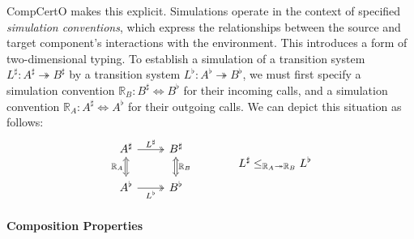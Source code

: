 \documentclass[acmsmall,screen,review,anonymous]{acmart}
\begin{document}
CompCertO makes this explicit.
Simulations operate in the context of specified
\emph{simulation conventions},
which express the relationships between
the source and target component's
interactions with the environment.
%
This introduces a form of two-dimensional typing. %
To establish a simulation
of a transition system $L^\sharp: A^\sharp \twoheadrightarrow B^\sharp$
by a transition system $L^\flat: A^\flat \twoheadrightarrow B^\flat$,
we must first specify a simulation convention
$\mathbb{R}_B : B^\sharp \Leftrightarrow B^\flat$
for their incoming calls,
and a simulation convention
$\mathbb{R}_A : A^\sharp \Leftrightarrow A^\flat$
for their outgoing calls.
We can depict this situation as follows:
\[
  \begin{tikzcd}
    A^\sharp
      \ar[r, twoheadrightarrow, "L^\sharp"]
      \ar[d, Leftrightarrow, "\mathbb{R}_A"'] &
    B^\sharp
      \ar[d, Leftrightarrow, "\mathbb{R}_B"] \\
    A^\flat
      \ar[r, twoheadrightarrow, "L^\flat"'] &
    B^\flat
  \end{tikzcd}
  \qquad \qquad
  L^\sharp \le_{\mathbb{R}_A \twoheadrightarrow \mathbb{R}_B} L^\flat
\]


\paragraph{Composition Properties} %
\end{document}
